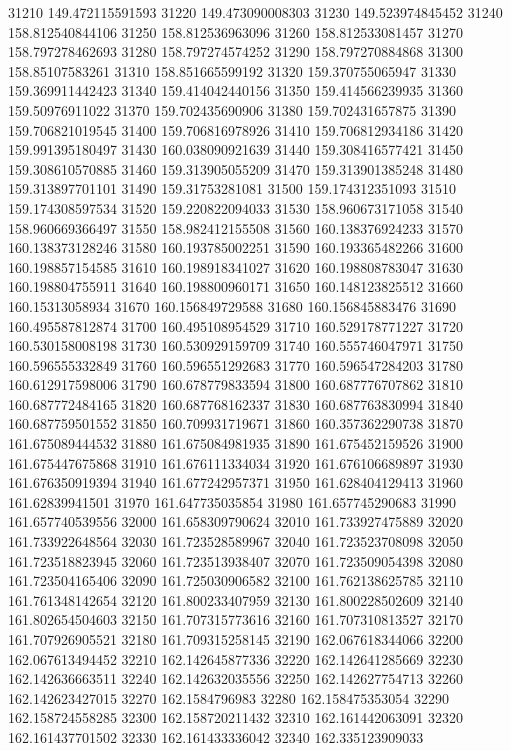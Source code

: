 {31210 149.472115591593
31220 149.473090008303
31230 149.523974845452
31240 158.812540844106
31250 158.812536963096
31260 158.812533081457
31270 158.797278462693
31280 158.797274574252
31290 158.797270884868
31300 158.85107583261
31310 158.851665599192
31320 159.370755065947
31330 159.369911442423
31340 159.414042440156
31350 159.414566239935
31360 159.50976911022
31370 159.702435690906
31380 159.702431657875
31390 159.706821019545
31400 159.706816978926
31410 159.706812934186
31420 159.991395180497
31430 160.038090921639
31440 159.308416577421
31450 159.308610570885
31460 159.313905055209
31470 159.313901385248
31480 159.313897701101
31490 159.31753281081
31500 159.174312351093
31510 159.174308597534
31520 159.220822094033
31530 158.960673171058
31540 158.960669366497
31550 158.982412155508
31560 160.138376924233
31570 160.138373128246
31580 160.193785002251
31590 160.193365482266
31600 160.198857154585
31610 160.198918341027
31620 160.198808783047
31630 160.198804755911
31640 160.198800960171
31650 160.148123825512
31660 160.15313058934
31670 160.156849729588
31680 160.156845883476
31690 160.495587812874
31700 160.495108954529
31710 160.529178771227
31720 160.530158008198
31730 160.530929159709
31740 160.555746047971
31750 160.596555332849
31760 160.596551292683
31770 160.596547284203
31780 160.612917598006
31790 160.678779833594
31800 160.687776707862
31810 160.687772484165
31820 160.687768162337
31830 160.687763830994
31840 160.687759501552
31850 160.709931719671
31860 160.357362290738
31870 161.675089444532
31880 161.675084981935
31890 161.675452159526
31900 161.675447675868
31910 161.676111334034
31920 161.676106689897
31930 161.676350919394
31940 161.677242957371
31950 161.628404129413
31960 161.62839941501
31970 161.647735035854
31980 161.657745290683
31990 161.657740539556
32000 161.658309790624
32010 161.733927475889
32020 161.733922648564
32030 161.723528589967
32040 161.723523708098
32050 161.723518823945
32060 161.723513938407
32070 161.723509054398
32080 161.723504165406
32090 161.725030906582
32100 161.762138625785
32110 161.761348142654
32120 161.800233407959
32130 161.800228502609
32140 161.802654504603
32150 161.707315773616
32160 161.707310813527
32170 161.707926905521
32180 161.709315258145
32190 162.067618344066
32200 162.067613494452
32210 162.142645877336
32220 162.142641285669
32230 162.142636663511
32240 162.142632035556
32250 162.142627754713
32260 162.142623427015
32270 162.1584796983
32280 162.158475353054
32290 162.158724558285
32300 162.158720211432
32310 162.161442063091
32320 162.161437701502
32330 162.161433336042
32340 162.335123909033
}
